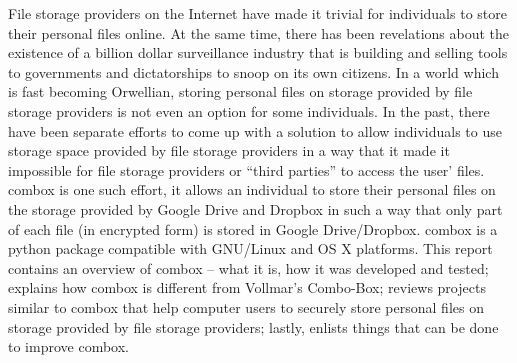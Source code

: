 \begin{abstractpage}\label{combox-abstract}
  File storage providers on the Internet have made it trivial for
  individuals to store their personal files online. At the same time,
  there has been revelations about the existence of a billion dollar
  surveillance industry\cite{website:wikileaks-spyfiles} that is
  building and selling tools to governments and dictatorships to snoop
  on its own citizens. In a world which is fast becoming Orwellian,
  storing personal files on storage provided by file storage providers
  is not even an option for some individuals. In the past, there have
  been separate efforts to come up with a solution to allow
  individuals to use storage space provided by file storage providers
  in a way that it made it impossible for file storage providers or
  ``third parties'' to access the user' files. combox is one such
  effort, it allows an individual to store their personal files on the
  storage provided by Google Drive and Dropbox in such a way that only
  part of each file (in encrypted form) is stored in Google
  Drive/Dropbox. combox is a python package compatible with GNU/Linux
  and OS X platforms. This report contains an overview of combox --
  what it is, how it was developed and tested; explains how combox is
  different from Vollmar's Combo-Box\cite{vollmar-combo-box}; reviews
  projects similar to combox that help computer users to securely
  store personal files on storage provided by file storage providers;
  lastly, enlists things that can be done to improve combox.
\end{abstractpage}
